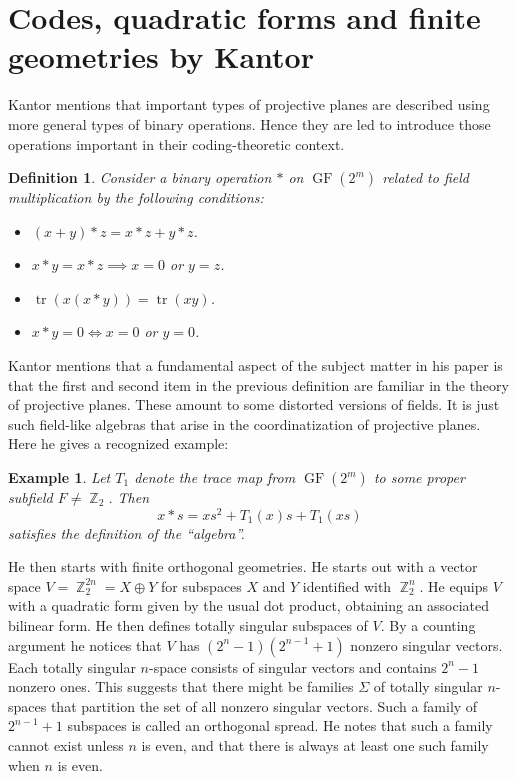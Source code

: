 \documentclass[a4paper]{article}
\DeclareMathOperator{\Z}{\mathbb{Z}}
\DeclareMathOperator{\tr}{tr}
\DeclareMathOperator{\GF}{GF}
\newtheorem{definition}{Definition}
\newtheorem{example}{Example}
\begin{document}
  \section{Codes, quadratic forms and finite geometries by
  Kantor}

  Kantor mentions that important types of projective planes
  are described using more general types of binary
  operations. Hence they are led to introduce those
  operations important in their coding-theoretic context.

  \begin{definition}
    Consider a binary operation $*$ on $\GF(2^{m})$ related
    to field multiplication by the following conditions:
    \begin{itemize}
      \item $(x+y) * z = x*z + y*z$.
      \item $x*y=x*z \implies x = 0$ or $y = z$.
      \item $\tr(x(x*y)) = \tr(xy)$.
      \item $x * y = 0 \iff x = 0$ or $y = 0$.
    \end{itemize}
  \end{definition}
  Kantor mentions that a fundamental aspect of the subject
  matter in his paper is that the first and second item in
  the previous definition are familiar in the theory of
  projective planes. These amount to some distorted versions
  of fields. It is just such field-like algebras that arise
  in the coordinatization of projective planes. Here he
  gives a recognized example:

  \begin{example}
    Let $T_1$ denote the trace map from $\GF(2^{m})$ to some
    proper subfield $F \neq \Z_2$. Then
    \[
      x * s = xs^2 + T_1(x)s + T_1(xs)
    \] 
    satisfies the definition of the ``algebra''.
  \end{example}

  He then starts with finite orthogonal geometries. He
  starts out with a vector space $V = \Z_2^{2n} = X \oplus
  Y$ for subspaces $X$ and $Y$ identified with $\Z_2^{n}$.
  He equips $V$ with a quadratic form given by the usual dot
  product, obtaining an associated bilinear form. He then
  defines totally singular subspaces of $V$. By a counting
  argument he notices that $V$ has $(2^{n}-1)(2^{n-1}+1)$ 
  nonzero singular vectors. Each totally singular $n$-space
  consists of singular vectors and contains $2^{n}-1$ 
  nonzero ones. This suggests that there might be families
  $\Sigma$ of totally singular $n$-spaces that partition the
  set of all nonzero singular vectors. Such a family of
  $2^{n-1}+1$ subspaces is called an orthogonal spread. He
  notes that such a family cannot exist unless $n$ is even,
  and that there is always at least one such family when $n$ 
  is even.
\end{document}
